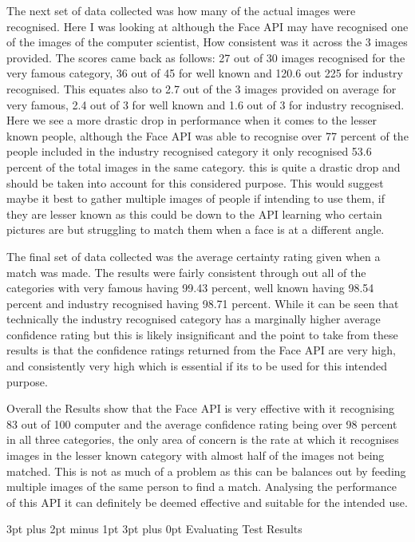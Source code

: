 \documentclass[12pt,a4paper]{article}
\makeatletter
\renewcommand\subsection{\@startsection {subsection}{1}{2mm} %
                               {3pt plus 2pt minus 1pt} %
                               {3pt plus 0pt} %
                               {\normalfont\bfseries}}
\makeatother
\begin{document}
The next set of data collected was how many of the actual images were recognised. Here I was looking at although the Face API may have recognised one of the images of the computer scientist, How consistent was it across the 3 images provided. The scores came back as follows: 27 out of 30 images recognised for the very famous category, 36 out of 45 for well known and 120.6 out 225 for industry recognised. This equates also to 2.7 out of the 3 images provided on average for very famous, 2.4 out of 3 for well known and 1.6 out of 3 for industry recognised. Here we see a more drastic drop in performance when it comes to the lesser known people, although the Face API was able to recognise over 77 percent of the people included in the industry recognised category it only recognised 53.6 percent of the total images in the same category. this is quite a drastic drop and should be taken into account for this considered purpose. This would suggest maybe it best to gather multiple images of people if intending to use them, if they are lesser known as this could be down to the API learning who certain pictures are but struggling to match them when a face is at a different angle.  

The final set of data collected was the average certainty rating given when a match was made. The results were fairly consistent through out all of the categories with very famous having 99.43 percent, well known having 98.54 percent and industry recognised having 98.71 percent. While it can be seen that technically the industry recognised category has a marginally higher average confidence rating but this is likely insignificant and the point to take from these results is that the confidence ratings returned from the Face API are very high, and consistently very high which is essential if its to be used for this intended purpose. 

Overall the Results show that the Face API is very effective with it recognising 83 out of 100 computer and the average confidence rating being over 98 percent in all three categories, the only area of concern is the rate at which it recognises images in the lesser known category with almost half of the images not being matched. This is not as much of a problem as this can be balances out by feeding multiple images of the same person to find a match. Analysing the performance of this API it can definitely be deemed effective and suitable for the intended use. 

\subsection{Evaluating Test Results} 
\end{document}
